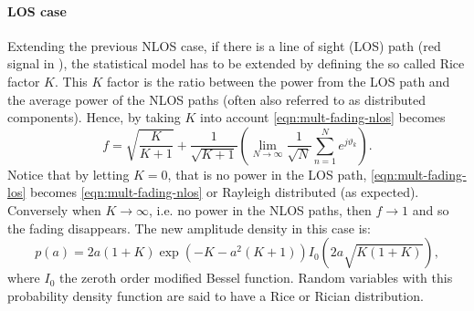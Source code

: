 \paragraph{LOS case}

Extending the previous NLOS case, if there is a line of sight (LOS) path (red signal in ), the statistical model has to be extended by defining the so called Rice factor \(K\). This \(K\) factor is the ratio between the power from the LOS path and the average power of the NLOS paths (often also referred to as distributed components). Hence, by taking \(K\) into account \eqref{eqn:mult-fading-nlos} becomes
\begin{equation} \label{eqn:mult-fading-los}
	f = \sqrt{\frac{K}{K+1}} + 
	\frac{1}{\sqrt{K+1}} \left(
		\lim_{N\rightarrow\infty} 
		\frac{1}{\sqrt{N}}\sum_{n=1}^{N} e^{j \vartheta_k}
	\right).
\end{equation}
Notice that by letting \(K = 0\), that is no power in the LOS path, \eqref{eqn:mult-fading-los} becomes \eqref{eqn:mult-fading-nlos} or Rayleigh distributed (as expected). Conversely when \(K \to \infty\), i.e. no power in the NLOS paths, then \(f \to 1\) and so the fading disappears. The new amplitude density in this case is:
\begin{equation}
	p(a)= 2a(1+K) \exp{\left(-K -a^2 (K+1) \right)} I_0 \left(2a\sqrt{K(1+K)} \right),
\end{equation}
where \(I_0\) the zeroth order modified Bessel function. Random variables with this probability density function are said to have a Rice or Rician distribution.


